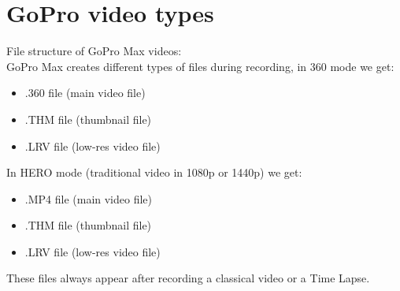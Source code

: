 \documentclass[a4paper,12pt]{book}
\begin{document}
\section{GoPro video types}
File structure of GoPro Max videos:\\	
GoPro Max creates different types of files during recording, in 360 mode we get:
	\begin{itemize}
		\item .360 file (main video file)
		\item .THM file (thumbnail file)
		\item .LRV file (low-res video file)\\
	\end{itemize}
	In HERO mode (traditional video in 1080p or 1440p) we get:
	\begin{itemize}
		\item .MP4 file (main video file)
		\item .THM file (thumbnail file)
		\item .LRV file (low-res video file)\\
	\end{itemize}
	These files always appear after recording a classical video or a Time Lapse.\\
	
\end{document}
